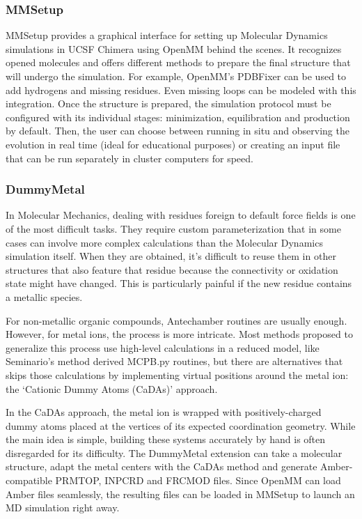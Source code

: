\subsubsection{MMSetup}
MMSetup provides a graphical interface for setting up Molecular Dynamics simulations in UCSF Chimera using OpenMM behind the scenes. It recognizes opened molecules and offers different methods to prepare the final structure that will undergo the simulation. For example, OpenMM’s PDBFixer\cite{pdbfixer} can be used to add hydrogens and missing residues. Even missing loops can be modeled with this integration. Once the structure is prepared, the simulation protocol must be configured with its individual stages: minimization, equilibration and production by default. Then, the user can choose between running in situ and observing the evolution in real time (ideal for educational purposes) or creating an input file that can be run separately in cluster computers for speed.

\subsubsection{DummyMetal}
In Molecular Mechanics, dealing with residues foreign to default force fields is one of the most difficult tasks. They require custom parameterization that in some cases can involve more complex calculations than the Molecular Dynamics simulation itself. When they are obtained, it’s difficult to reuse them in other structures that also feature that residue because the connectivity or oxidation state might have changed. This is particularly painful if the new residue contains a metallic species.

For non-metallic organic compounds, Antechamber\cite{wang2001antechamber} routines are usually enough. However, for metal ions, the process is more intricate. Most methods proposed to generalize this process use high-level calculations in a reduced model, like Seminario’s method derived MCPB.py routines,\cite{mcpbpy} but there are alternatives that skips those calculations by implementing virtual positions around the metal ion: the ‘Cationic Dummy Atoms (CaDAs)’ approach.\cite{duarte2014}

In the CaDAs approach, the metal ion is wrapped with positively-charged dummy atoms placed at the vertices of its expected coordination geometry. While the main idea is simple, building these systems accurately by hand is often disregarded for its difficulty. The DummyMetal extension can take a molecular structure, adapt the metal centers with the CaDAs method and generate Amber-compatible PRMTOP, INPCRD and FRCMOD files. Since OpenMM can load Amber files seamlessly, the resulting files can be loaded in MMSetup to launch an MD simulation right away.


